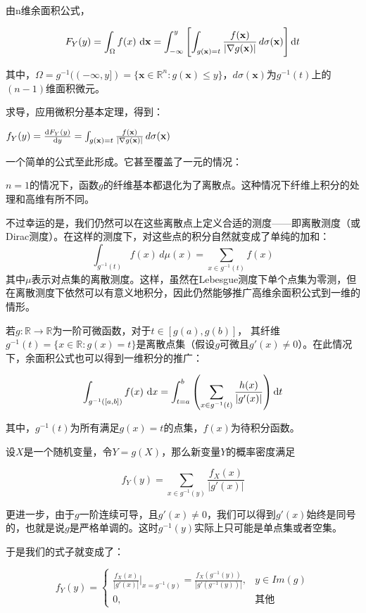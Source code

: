 由n维余面积公式，

\[
    F_Y(y) = \int_{\Omega} f(x)\,\mathop{}\!\mathrm{d}\mathbf{x}
= \int_{-\infty}^{y}
  \left[ \int_{g(\mathbf{x})=t} \frac{f(\mathbf{x})}{|\nabla g(\mathbf{x})|}\, d\sigma(\mathbf{x}) \right] \mathop{}\!\mathrm{d} t
\]

其中，$\Omega = g^{-1}((-\infty,y]) = \{\mathbf{x} \in \mathbb{R}^n :g(\mathbf{x}) \leq y\}$，$d\sigma(\mathbf{x})$为$g^{-1}(t)$上的$(n-1)$维面积微元。

求导，应用微积分基本定理，得到：

$f_Y(y) = \frac{\mathop{}\!\mathrm{d} F_Y(y)}{\mathop{}\!\mathrm{d} y} = \int_{g(\mathbf{x})=t} \frac{f(\mathbf{x})}{|\nabla g(\mathbf{x})|}\, d\sigma(\mathbf{x})$

一个简单的公式至此形成。它甚至覆盖了一元的情况：

$n=1$的情况下，函数$g$的纤维基本都退化为了离散点。这种情况下纤维上积分的处理和高维有所不同。

不过幸运的是，我们仍然可以在这些离散点上定义合适的测度——即离散测度（或Dirac测度）。在这样的测度下，对这些点的积分自然就变成了单纯的加和：
\[
\int_{g^{-1}(t)} f(x)\,d\mu(x) = \sum_{x \in g^{-1}(t)} f(x)
\]
其中$\mu$表示对点集的离散测度。这样，虽然在Lebesgue测度下单个点集为零测，但在离散测度下依然可以有意义地积分，因此仍然能够推广高维余面积公式到一维的情形。

若$g:\mathbb{R}\to \mathbb{R}$为一阶可微函数，对于$t\in[g(a), g(b)]$，
其纤维$g^{-1}(t)=\{x\in \mathbb{R}: g(x)=t\}$是离散点集（假设$g$可微且$g\prime(x)\neq0$）。在此情况下，余面积公式也可以得到一维积分的推广：

\[
\int_{g^{-1}([a,b])} f(x)\, \mathop{}\!\mathrm{d} x = \int_{t = a}^{b} \left( \sum_{x \in g^{-1}(t)} \frac{h(x)}{|g'(x)|} \right) \mathop{}\!\mathrm{d} t
\]

其中，$g^{-1}(t)$为所有满足$g(x)=t$的点集，$f(x)$为待积分函数。

设$X$是一个随机变量，令$Y=g(X)$，那么新变量$Y$的概率密度满足

\[
f_Y(y) = \sum_{x \in g^{-1}(y)} \frac{f_X(x)}{|g'(x)|}
\]

更进一步，由于$g$一阶连续可导，且$g'(x) \neq 0$，我们可以得到$g'(x)$始终是同号的，也就是说$g$是严格单调的。这时$g^{-1}(y)$实际上只可能是单点集或者空集。

于是我们的式子就变成了：

\[
f_Y(y) = 
\begin{cases}
\frac{f_X(x)}{|g'(x)|} \bigg|_{x = g^{-1}(y)} = \frac{f_X(g^{-1}(y))}{|g'(g^{-1}(y))|}, & y \in Im(g) \\
0, & \text{其他}
\end{cases}
\]


